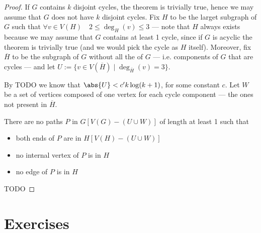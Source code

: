 \documentclass[a4paper, 12pt]{report}
\begin{document}
    \begin{proof}
        If $G$ contains $k$ disjoint cycles, the theorem is trivially true, hence we may assume that $G$ does not have $k$ disjoint cycles. Fix $H$ to be the larget subgraph of $G$ such that $\forall v \in V(H) \quad 2 \le \deg_H(v) \le 3$ --- note that $H$ always exists because we may assume that $G$ contains at least 1 cycle, since if $G$ is acyclic the theorem is trivially true (and we would pick the cycle as $H$ itself). Moreover, fix $\overline H$ to be the subgraph of $G$ without all the  of $G$ --- i.e. components of $G$ that are cycles --- and let $U := \{v \in V(\overline H) \mid \deg_{\overline H}(v) = 3\}$.

        By TODO  we know that $\abs{U} < c'k\log(k + 1)$, for some constant $c$. Let $W$ be a set of vertices composed of one vertex for each cycle component --- the ones not present in $\overline H$.


         There are no paths $P$ in $G[V(G) - (U \cup W)]$ of length at least 1 such that

        \begin{itemize}
            \item both ends of $P$ are in $H[V(H) - (U \cup W)]$
            \item no internal vertex of $P$ is in $H$
            \item no edge of $P$ is in $H$
        \end{itemize}



        TODO 
    \end{proof}

    \section{Exercises}
    
\end{document}
